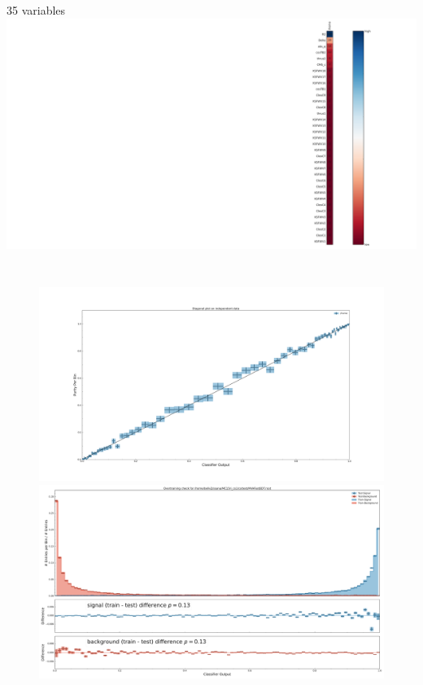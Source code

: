 \documentclass[12pt]{beamer}
\begin{document}
\begin{frame}{35 variables}
\hspace{-1in}
\includegraphics[width=1.25\textwidth]{evaluate_35/importance.pdf}
	\vspace{-3.3in}
	\begin{columns}
		\begin{figure}
			\includegraphics[width=1.0\textwidth]{evaluate_35/diagonal_plot_test.pdf}
			\includegraphics[width=1.0\textwidth]{evaluate_35/overtraining_plot_-6845103939654726996.pdf}
		\end{figure}
		
	\end{columns}
\end{frame}



\end{document}
